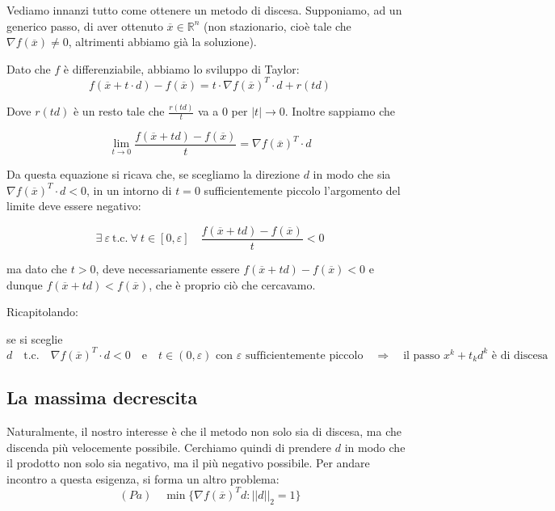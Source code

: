 Vediamo innanzi tutto come ottenere un metodo di discesa. Supponiamo,
ad un generico passo, di aver ottenuto $ \overline{x} \in
\mathbb{R}^{n}$ (non stazionario, cio\`e tale che $\nabla
f(\overline{x}) \neq 0$, altrimenti abbiamo gi\`a la soluzione).

Dato che $f$ \`e differenziabile, abbiamo lo sviluppo di Taylor:
$$f(\overline{x} +t \cdot d) -f(\overline{x}) = t \cdot \nabla f(\overline{x})^{T} \cdot d + r(td)$$

Dove $r(td)$ \`e un resto tale che $\frac{r(td)}{t}$ va a $0$ per $|t| \longrightarrow 0$. Inoltre
sappiamo che

$$ \lim_{t \to 0} \frac{f(\overline{x}+td)- f(\overline{x})}{t} = \nabla f(\overline{x})^{T} \cdot d $$

Da questa equazione si ricava che, se scegliamo la direzione $d$ in
modo che sia $\nabla f(\overline{x})^{T} \cdot d < 0$, in un intorno
di $t=0$ sufficientemente piccolo l'argomento del limite deve essere
negativo:

$$\exists ~ \varepsilon ~ \text{t.c.}~ \forall ~ t \in [0,\varepsilon] \quad \frac{f(\overline{x}+td)- f(\overline{x})}{t} < 0$$

ma dato che $t>0$, deve necessariamente essere $f(\overline{x}+td)-
f(\overline{x}) < 0$ e dunque $f(\overline{x}+td) < f(\overline{x})$,
che \`e proprio ciò che cercavamo.

Ricapitolando:
\begin{property}
\label{prop:metodo-discesa-gradiente-direzione} se si sceglie
$$d \quad \text{t.c.} \quad \nabla f(\overline{x})^{T} \cdot d < 0 \quad \text{e} \quad  t \in (0, \varepsilon) \text{ con }\varepsilon\text{ sufficientemente piccolo} \quad \Longrightarrow \quad \text{il passo } x^{k} + t_k d^{k} \text{ \`e di discesa} $$
\end{property}
\subsection{La massima decrescita}
\label{subsection:massima-decrescita} Naturalmente, il nostro
interesse \`e che il metodo non solo sia di discesa, ma che discenda pi\`u
velocemente possibile. Cerchiamo quindi di prendere $d$ in modo che il
prodotto non solo sia negativo, ma il pi\`u negativo possibile. Per
andare incontro a questa esigenza, si forma un altro problema:
\begin{equation}
\label{prob:pa} (Pa) \quad \min \{ \nabla f(\overline{x})^{T}d :
||d||_2 = 1 \}
\end{equation}

